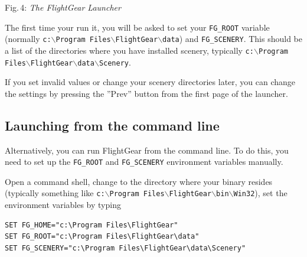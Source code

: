  \centerline{}
\smallskip
\noindent
Fig.\,4: \textit{The FlightGear Launcher}

\medskip

The first time your run it, you will be asked to set your \texttt{FG\_ROOT} variable
(normally \texttt{c:$\backslash$Program Files$\backslash$FlightGear$\backslash$data}) and \texttt{FG\_SCENERY}.
This should be a list of the directories where you have installed scenery, typically
\texttt{c:$\backslash$Program Files$\backslash$FlightGear$\backslash$data$\backslash$Scenery}.

If you set invalid values or change your scenery directories later, you can
change the settings by pressing the ''Prev'' button from the first page of
the launcher.

\subsection{Launching from the command line}

Alternatively, you can run FlightGear from the command line. To do this, you
need to set up the \texttt{FG\_ROOT} and \texttt{FG\_SCENERY} environment
variables manually.

Open a command shell, change to the directory where your binary resides
(typically something like
\texttt{c:$\backslash$Program Files$\backslash$FlightGear$\backslash$bin$\backslash$Win32}),
set the environment variables by typing
\medskip

\begin{verbatim}
SET FG_HOME="c:\Program Files\FlightGear"
SET FG_ROOT="c:\Program Files\FlightGear\data"
SET FG_SCENERY="c:\Program Files\FlightGear\data\Scenery"
\end{verbatim}
\medskip

